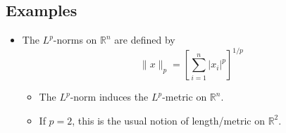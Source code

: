 \documentclass{article}
\newcommand{\R}{\mathbb{R}}
\theoremstyle{plain}
\theoremstyle{definition}
\begin{document}
		\subsection{Examples}
		\begin{itemize}
				\item The $L^p$-norms on $\R^n$ are defined by 
						\begin{equation*}
								\|x\|_p = \left[ \sum_{i=1}^{n} |x_i|^p \right]^{1/p}
						\end{equation*}
						\begin{itemize}
								\item The $L^p$-norm induces the $L^p$-metric on $\R^n$.
								\item If $p = 2$, this is the usual notion of length/metric on $\R^2$.
						\end{itemize}
		\end{itemize}
\end{document}
